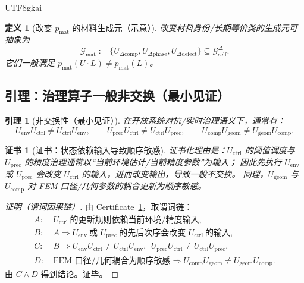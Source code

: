 \documentclass[12pt]{article}
\newtheorem{definition}{定义}[section]
\newtheorem{lemma}{引理}[section]
\newtheorem{certificate}{证书}[section]
\begin{document}
\begin{CJK*}{UTF8}{gkai}
\begin{definition}[改变 $p_{\mathrm{mat}}$ 的材料生成元（示意）]
\label{def:markdown-material-generators}
改变材料身份/长期等价类的生成元可抽象为
\[
\mathcal{G}_{\mathrm{mat}}
:=
\{U_{\Delta\mathrm{comp}},U_{\Delta\mathrm{phase}},U_{\Delta\mathrm{defect}}\}
\subseteq \mathcal{G}_{\mathrm{self}}^{\Delta}.
\]
它们一般满足 $p_{\mathrm{mat}}(U\cdot L)\neq p_{\mathrm{mat}}(L)$。
\end{definition}

\subsection{引理：治理算子一般非交换（最小见证）}

\begin{lemma}[非交换性（最小见证）]
\label{lem:markdown-noncommutative}
在开放系统对抗/实时治理语义下，通常有：
\[
U_{\mathrm{env}}U_{\mathrm{ctrl}}\neq U_{\mathrm{ctrl}}U_{\mathrm{env}},
\qquad
U_{\mathrm{prec}}U_{\mathrm{ctrl}}\neq U_{\mathrm{ctrl}}U_{\mathrm{prec}},
\qquad
U_{\mathrm{comp}}U_{\mathrm{geom}}\neq U_{\mathrm{geom}}U_{\mathrm{comp}}.
\]
\end{lemma}

\begin{certificate}[证书：状态依赖输入导致顺序敏感]
\label{cert:markdown-noncommutative}
证书化理由是：$U_{\mathrm{ctrl}}$ 的阈值调度与 $U_{\mathrm{prec}}$ 的精度治理通常以“当前环境估计/当前精度参数”为输入；
因此先执行 $U_{\mathrm{env}}$ 或 $U_{\mathrm{prec}}$ 会改变 $U_{\mathrm{ctrl}}$ 的输入，进而改变输出，导致一般不交换。
同理，$U_{\mathrm{geom}}$ 与 $U_{\mathrm{comp}}$ 对 FEM 口径/几何参数的耦合更新为顺序敏感。
\end{certificate}

\begin{proof}[证明（谓词因果链）]
由 Certificate~\ref{cert:markdown-noncommutative}，取谓词链：
\[
\begin{aligned}
A:&\ U_{\mathrm{ctrl}}\ \text{的更新规则依赖当前环境/精度输入},\\
B:&\ A\Rightarrow U_{\mathrm{env}}\ \text{或 }U_{\mathrm{prec}}\ \text{的先后次序会改变 }U_{\mathrm{ctrl}}\ \text{的输入},\\
C:&\ B\Rightarrow U_{\mathrm{env}}U_{\mathrm{ctrl}}\neq U_{\mathrm{ctrl}}U_{\mathrm{env}},\ \ U_{\mathrm{prec}}
  U_{\mathrm{ctrl}}\neq U_{\mathrm{ctrl}}U_{\mathrm{prec}},\\
D:&\ \text{FEM 口径/几何耦合为顺序敏感}\Rightarrow U_{\mathrm{comp}}U_{\mathrm{geom}}\neq U_{\mathrm{geom}}U_{\mathrm{comp}}.
\end{aligned}
\]
由 $C\wedge D$ 得到结论。证毕。
\end{proof}


\end{CJK*}
\end{document}
